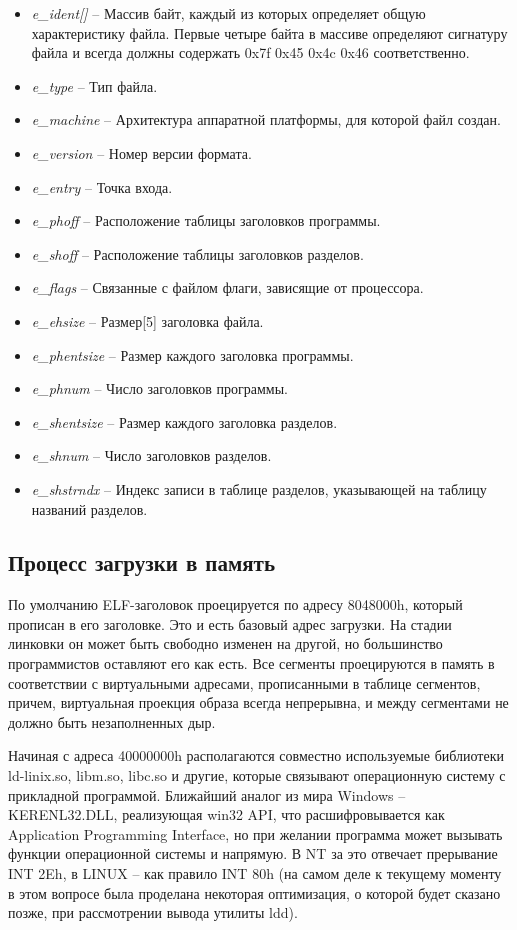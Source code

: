 \begin{itemize}
\item{ \textit{e\_ident[]} -- Массив байт, каждый из которых определяет общую характеристику файла. Первые четыре байта в массиве определяют сигнатуру файла и всегда должны содержать 0x7f 0x45 0x4c 0x46 соответственно.}
\item{ \textit{e\_type} -- Тип файла.}
\item{ \textit{e\_machine} -- Архитектура аппаратной платформы, для которой файл создан.}
\item{ \textit{e\_version} -- Номер версии формата.}
\item{ \textit{e\_entry} -- Точка входа.}
\item{ \textit{e\_phoff} -- Расположение таблицы заголовков программы.}
\item{ \textit{e\_shoff} -- Расположение таблицы заголовков разделов.}
\item{ \textit{e\_flags} -- Связанные с файлом флаги, зависящие от процессора.}
\item{ \textit{e\_ehsize} -- Размер[5] заголовка файла.}
\item{ \textit{e\_phentsize} -- Размер каждого заголовка программы.}
\item{ \textit{e\_phnum} -- Число заголовков программы.}
\item{ \textit{e\_shentsize} -- Размер каждого заголовка разделов.}
\item{ \textit{e\_shnum} -- Число заголовков разделов.}
\item{ \textit{e\_shstrndx} -- Индекс записи в таблице разделов, указывающей на таблицу названий разделов.}
\end{itemize}

\subsection{Процесс загрузки в память}

По умолчанию ELF-заголовок проецируется по адресу 8048000h, который прописан в его заголовке. Это и есть базовый адрес загрузки. На стадии линковки он может быть свободно изменен на другой, но большинство программистов оставляют его как есть. Все сегменты проецируются в память в соответствии с виртуальными адресами, прописанными в таблице сегментов, причем, виртуальная проекция образа всегда непрерывна, и между сегментами не должно быть незаполненных дыр.

Начиная с адреса 40000000h располагаются совместно используемые библиотеки ld-linix.so, libm.so, libc.so и другие, которые связывают операционную систему с прикладной программой. Ближайший аналог из мира Windows -- KERENL32.DLL, реализующая win32 API, что расшифровывается как Application Programming Interface, но при желании программа может вызывать функции операционной системы и напрямую. В NT за это отвечает прерывание INT 2Eh, в LINUX -- как правило INT 80h (на самом деле к текущему моменту в этом вопросе была проделана некоторая оптимизация, о которой будет сказано позже, при рассмотрении вывода утилиты ldd)\cite{Cit3}.

